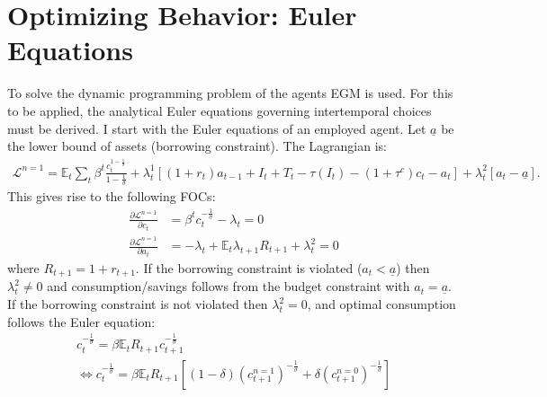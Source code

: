 \section{Optimizing Behavior: Euler Equations}
To solve the dynamic programming problem of the agents EGM is used. For this to be applied, the analytical Euler equations governing intertemporal choices must be derived. I start with the Euler equations of an employed agent. Let $\underline{a}$ be the lower bound of assets (borrowing constraint). The Lagrangian is: 
\begin{align*}
\mathcal{L}^{n=1}=\mathbb{E}_{t}\sum_{t}\beta^{t}\frac{c_{t}^{1-\frac{1}{\sigma}}}{1-\frac{1}{\sigma}}+\lambda_{t}^{1}\left[\left(1+r_{t}\right)a_{t-1}+I_{t}+T_{t}-\tau\left(I_{t}\right)-\left(1+\tau^{c}\right)c_{t}-a_{t}\right]+\lambda_{t}^{2}\left[a_{t}-\underline{a}\right].
\end{align*}
This gives rise to the following FOCs: 
\begin{align*}
\frac{\partial\mathcal{L}^{n=1}}{\partial c_{t}}&=\beta^{t}c_{t}^{-\frac{1}{\sigma}}-\lambda_{t} =0 \\
\frac{\partial\mathcal{L}^{n=1}}{\partial a_{t}}&=-\lambda_{t}+\mathbb{E}_{t}\lambda_{t+1}R_{t+1} +\lambda_{t}^{2}= 0
\end{align*}
where $R_{t+1}=1+r_{t+1}$. If the borrowing constraint is violated ($a_{t}<\underline{a}$) then $\lambda_{t}^{2}\neq0$ and consumption/savings follows from the budget constraint with $a_{t}=\underline{a}$. If the borrowing constraint is not violated then $\lambda_{t}^{2}=0$, and optimal consumption follows 
the Euler equation: 
\begin{gather*}
c_{t}^{-\frac{1}{\sigma}}=\beta\mathbb{E}_{t}R_{t+1}c_{t+1}^{-\frac{1}{\sigma}}\\
\Leftrightarrow c_{t}^{-\frac{1}{\sigma}}=\beta\mathbb{E}_{t}R_{t+1}\left[\left(1-\delta\right)\left(c_{t+1}^{n=1}\right)^{-\frac{1}{\sigma}}+\delta\left(c_{t+1}^{n=0}\right)^{-\frac{1}{\sigma}}\right]   
\end{gather*}


